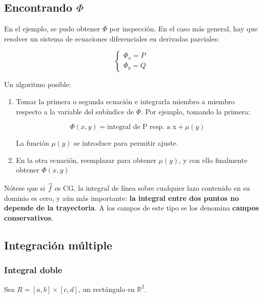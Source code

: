 \documentclass{article}
\renewcommand{\Bbb}{\mathbb}
\begin{document}
\subsection{Encontrando \texorpdfstring{$\Phi$}{phi}}

En el ejemplo, se pudo obtener $\Phi$ por inspección. En el caso más general, hay que resolver un sistema de ecuaciones diferenciales en derivadas parciales:

\begin{equation}
\left\{
\begin{array}{ll}
\Phi_x = P \\
\Phi_y = Q
\end{array}
\right.
\end{equation}

Un algoritmo posible:

\begin{enumerate}
\item Tomar la primera o segunda ecuación e integrarla miembro a miembro respecto a la variable del subíndice de $\Phi$. Por ejemplo, tomando la primera:

\begin{equation}
\Phi(x,y) = \text{integral de P resp. a x} + \mu(y)
\end{equation}

La función $\mu(y)$ se introduce para permitir ajuste.

\item En la otra ecuación, reemplazar para obtener $\mu(y)$, y con ello finalmente obtener $\Phi(x,y)$

\end{enumerate}

Nótese que si $\overrightarrow{f}$ es CG, la integral de línea sobre cualquier lazo contenido en su dominio es cero, y aún más importante: \textbf{la integral entre dos puntos no depende de la trayectoria}. A los campos de este tipo se los denomina \textbf{campos conservativos}.

\subsection{Integración múltiple}

\subsubsection{Integral doble}

Sea $R = [a, b] \times [c, d]$, un rectángulo en $\Bbb R^2$.
\end{document}
